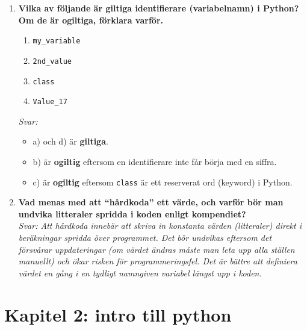 \documentclass[11pt,a4paper]{article}
\begin{document}
\begin{enumerate}[label=\bfseries\color{primary}Fråga \arabic*:, leftmargin=1.8cm]
    \item {\bfseries Vilka av följande är giltiga identifierare (variabelnamn) i Python? Om de är ogiltiga, förklara varför.}
    \begin{enumerate}[label=\alph*)]
        \item \texttt{my\_variable}
        \item \texttt{2nd\_value}
        \item \texttt{class}
        \item \texttt{Value\_17}
    \end{enumerate}
    {\itshape Svar:}
    \begin{itemize}
        \item a) och d) är {\bfseries giltiga}.
        \item b) är {\bfseries ogiltig} eftersom en identifierare inte får börja med en siffra.
        \item c) är {\bfseries ogiltig} eftersom \texttt{class} är ett reserverat ord (keyword) i Python.
    \end{itemize}

    \item {\bfseries Vad menas med att ``hårdkoda'' ett värde, och varför bör man undvika litteraler spridda i koden enligt kompendiet?}
    \\ {\itshape Svar: Att hårdkoda innebär att skriva in konstanta värden (litteraler) direkt i beräkningar spridda över programmet. Det bör undvikas eftersom det försvårar uppdateringar (om värdet ändras måste man leta upp alla ställen manuellt) och ökar risken för programmeringsfel. Det är bättre att definiera värdet en gång i en tydligt namngiven variabel längst upp i koden.}
\end{enumerate}

\section{Kapitel 2: intro till python}
\end{document}
